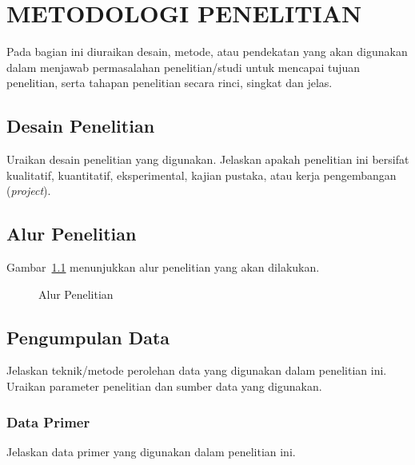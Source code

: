 
\chapter{METODOLOGI PENELITIAN}

Pada bagian ini diuraikan desain, metode, atau pendekatan yang akan digunakan dalam menjawab permasalahan penelitian/studi untuk mencapai tujuan penelitian, serta tahapan penelitian secara rinci, singkat dan jelas.

\section{Desain Penelitian}

Uraikan desain penelitian yang digunakan. Jelaskan apakah penelitian ini bersifat kualitatif, kuantitatif, eksperimental, kajian pustaka, atau kerja pengembangan (\textit{project}).

\section{Alur Penelitian}

Gambar~\ref{fig:alur-penelitian} menunjukkan alur penelitian yang akan dilakukan.

\begin{figure}[htbp]
    \centering
    \caption{Alur Penelitian}
    \label{fig:alur-penelitian}
\end{figure}

\section{Pengumpulan Data}

Jelaskan teknik/metode perolehan data yang digunakan dalam penelitian ini. Uraikan parameter penelitian dan sumber data yang digunakan.

\subsection{Data Primer}

Jelaskan data primer yang digunakan dalam penelitian ini.

